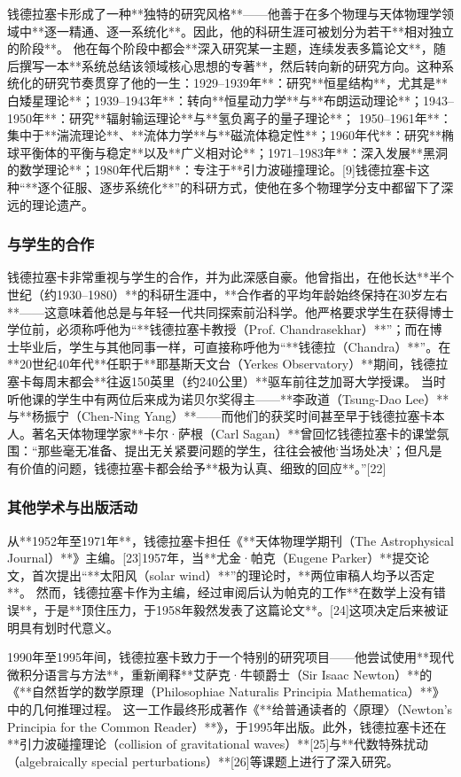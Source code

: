 钱德拉塞卡形成了一种**独特的研究风格**——他善于在多个物理与天体物理学领域中**逐一精通、逐一系统化**。因此，他的科研生涯可被划分为若干**相对独立的阶段**。
他在每个阶段中都会**深入研究某一主题，连续发表多篇论文**，随后撰写一本**系统总结该领域核心思想的专著**，然后转向新的研究方向。这种系统化的研究节奏贯穿了他的一生：1929–1939年**：研究**恒星结构**，尤其是**白矮星理论**；1939–1943年**：转向**恒星动力学**与**布朗运动理论**；1943–1950年**：研究**辐射输运理论**与**氢负离子的量子理论**；
1950–1961年**：集中于**湍流理论**、**流体力学**与**磁流体稳定性**；1960年代**：研究**椭球平衡体的平衡与稳定**以及**广义相对论**；1971–1983年**：深入发展**黑洞的数学理论**；1980年代后期**：专注于**引力波碰撞理论。[9]钱德拉塞卡这种“**逐个征服、逐步系统化**”的科研方式，使他在多个物理学分支中都留下了深远的理论遗产。
\subsubsection{与学生的合作}
钱德拉塞卡非常重视与学生的合作，并为此深感自豪。他曾指出，在他长达**半个世纪（约1930–1980）**的科研生涯中，**合作者的平均年龄始终保持在30岁左右**——这意味着他总是与年轻一代共同探索前沿科学。他严格要求学生在获得博士学位前，必须称呼他为“**钱德拉塞卡教授（Prof. Chandrasekhar）**”；而在博士毕业后，学生与其他同事一样，可直接称呼他为“**钱德拉（Chandra）**”。在**20世纪40年代**任职于**耶基斯天文台（Yerkes Observatory）**期间，钱德拉塞卡每周末都会**往返150英里（约240公里）**驱车前往芝加哥大学授课。
当时听他课的学生中有两位后来成为诺贝尔奖得主——**李政道（Tsung-Dao Lee）**与**杨振宁（Chen-Ning Yang）**——而他们的获奖时间甚至早于钱德拉塞卡本人。著名天体物理学家**卡尔·萨根（Carl Sagan）**曾回忆钱德拉塞卡的课堂氛围：“那些毫无准备、提出无关紧要问题的学生，往往会被他‘当场处决’；但凡是有价值的问题，钱德拉塞卡都会给予**极为认真、细致的回应**。”[22]
\subsubsection{其他学术与出版活动}
从**1952年至1971年**，钱德拉塞卡担任《**天体物理学期刊（The Astrophysical Journal）**》主编。[23]1957年，当**尤金·帕克（Eugene Parker）**提交论文，首次提出“**太阳风（solar wind）**”的理论时，**两位审稿人均予以否定**。
然而，钱德拉塞卡作为主编，经过审阅后认为帕克的工作**在数学上没有错误**，于是**顶住压力，于1958年毅然发表了这篇论文**。[24]这项决定后来被证明具有划时代意义。

1990年至1995年间，钱德拉塞卡致力于一个特别的研究项目——他尝试使用**现代微积分语言与方法**，重新阐释**艾萨克·牛顿爵士（Sir Isaac Newton）**的《**自然哲学的数学原理（Philosophiae Naturalis Principia Mathematica）**》中的几何推理过程。
这一工作最终形成著作《**给普通读者的〈原理〉（Newton’s Principia for the Common Reader）**》，于1995年出版。此外，钱德拉塞卡还在**引力波碰撞理论（collision of gravitational waves）**[25]与**代数特殊扰动（algebraically special perturbations）**[26]等课题上进行了深入研究。
